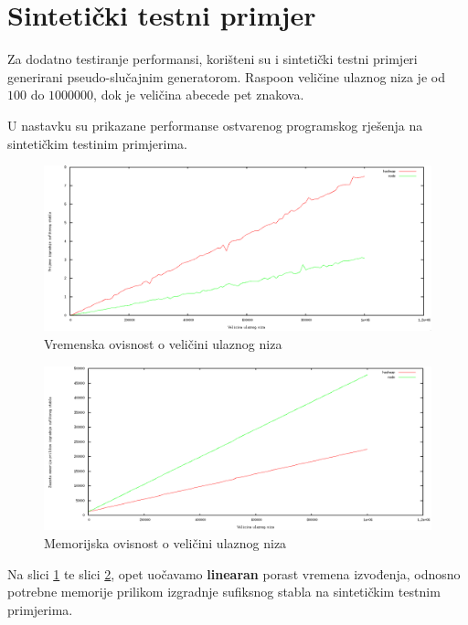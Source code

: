 \documentclass[times, utf8, seminar, numeric]{fer}
\begin{document}
\section{Sintetički testni primjer}
	Za dodatno testiranje performansi, korišteni su i sintetički testni primjeri generirani pseudo-slučajnim generatorom. Raspoon veličine ulaznog niza je od $100$ do $1000000$, dok je veličina abecede pet  znakova.
	
	U nastavku su prikazane performanse ostvarenog programskog rješenja na sintetičkim testinim primjerima.

\begin{figure}[h!]	
	\centering
	\includegraphics[width=1\textwidth]{media/time_r.png}
	\caption{Vremenska ovisnost o veličini ulaznog niza}
	\label{image:timer}
\end{figure}

\begin{figure}[h!]	
	\centering
	\includegraphics[width=1\textwidth]{media/memory_r.png}
	\caption{Memorijska ovisnost o veličini ulaznog niza}
	\label{image:memoryr}
\end{figure}

\pagebreak

Na slici \ref{image:timer} te slici \ref{image:memoryr}, opet uočavamo \textbf{linearan} porast vremena izvođenja, odnosno potrebne memorije prilikom izgradnje sufiksnog stabla na sintetičkim testnim primjerima.
\end{document}
